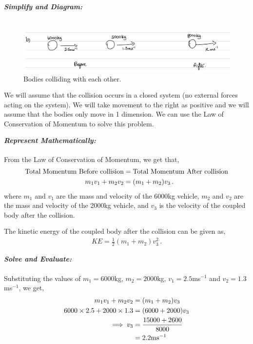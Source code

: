 \begin{subquestions}
\begin{subsubquestions}
\textbf{\textit{Simplify and Diagram:}} \\ \\
\begin{figure}[H]
	\begin{center}
		\includegraphics[scale=0.25]{../2008/figures/2008Jq5-1}
		\caption{\label{2008J:q5:Diagram1} Bodies colliding with each other.}
	\end{center}
\end{figure}	
We will assume that the collision occurs in a closed system (no external forces acting on the system). We will take movement to the right as positive and we will assume that the bodies only move in 1 dimension. We can use the Law of Conservation of Momentum to solve this problem.




\textbf{\textit{Represent Mathematically:}} \\ \\
From the Law of Conservation of Momentum, we get that,
\begin{align}
	\text{Total Momentum Before collision} & = \text{Total Momentum After collision} \nonumber \\
	m_1v_1 + m_2v_2 & = (m_1+m_2)v_3 \,.
\end{align}
where $m_1$ and $v_1$ are the mass and velocity of the 6000kg vehicle, $m_2$ and $v_2$ are the mass and velocity of the 2000kg vehicle, and $v_3$ is the velocity of the coupled body after the collision.

The kinetic energy of the coupled body after the collision can be given as,
\begin{align}
	KE = \frac{1}{2}(m_1+m_2)v_3^2 \,.
\end{align}


\textbf{\textit{Solve and Evaluate:}} \\ \\
Substituting the values of $m_1=6000$kg, $m_2=2000$kg, $v_1=2.5$ms$^{-1}$ and $v_2=1.3$ms$^{-1}$, we get,
\begin{align}
	m_1v_1 + m_2v_2 & = (m_1+m_2)v_3 \nonumber \\
	6000\times2.5 + 2000\times1.3 & = (6000+2000)v_3 \nonumber \\
	\implies v_3 & = \frac{15000+2600}{8000} \nonumber \\
	& = 2.2\text{ms}^{-1}
\end{align}


\end{subsubquestions}
\end{subquestions}
